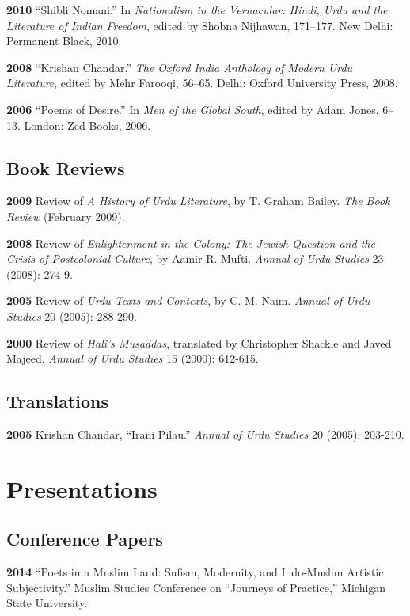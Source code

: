 \documentclass[letterpaper,12pt]{article}
\begin{document}
\textbf{2010}
“Shibli Nomani.”
In \emph{Nationalism in the Vernacular:
Hindi, Urdu and the Literature of Indian Freedom},
edited by Shobna Nijhawan,
171–177.
New Delhi: Permanent Black, 2010.

\textbf{2008} “Krishan Chandar.”
\emph{The Oxford India Anthology of Modern Urdu Literature},
edited by Mehr Farooqi, 56–65.
Delhi: Oxford University Press, 2008.

\textbf{2006}
“Poems of Desire.”
In \emph{Men of the Global South},
edited by Adam Jones,
6–13.
London: Zed Books, 2006.


\subsection{Book Reviews%
  \label{book-reviews}%
}

\textbf{2009}
Review of \emph{A History of Urdu Literature},
by T. Graham Bailey.
\emph{The Book Review} (February 2009).

\textbf{2008}
Review of \emph{Enlightenment in the Colony:
The Jewish Question and the Crisis of Postcolonial Culture},
by Aamir R. Mufti.
\emph{Annual of Urdu Studies} 23 (2008): 274-9.

\textbf{2005}
Review of \emph{Urdu Texts and Contexts},
by C. M. Naim.
\emph{Annual of Urdu Studies} 20 (2005): 288-290.

\textbf{2000}
Review of \emph{Hali’s Musaddas},
translated by Christopher Shackle and Javed Majeed.
\emph{Annual of Urdu Studies} 15 (2000): 612-615.


\subsection{Translations%
  \label{translations}%
}

\textbf{2005} Krishan Chandar, “Irani Pilau.”
\emph{Annual of Urdu Studies} 20 (2005): 203-210.


\section{Presentations%
  \label{presentations}%
}


\subsection{Conference Papers%
  \label{conference-papers}%
}

\textbf{2014}
“Poets in a Muslim Land:
Sufism, Modernity, and Indo-Muslim Artistic Subjectivity.”
Muslim Studies Conference on “Journeys of Practice,”
Michigan State University.
\end{document}
